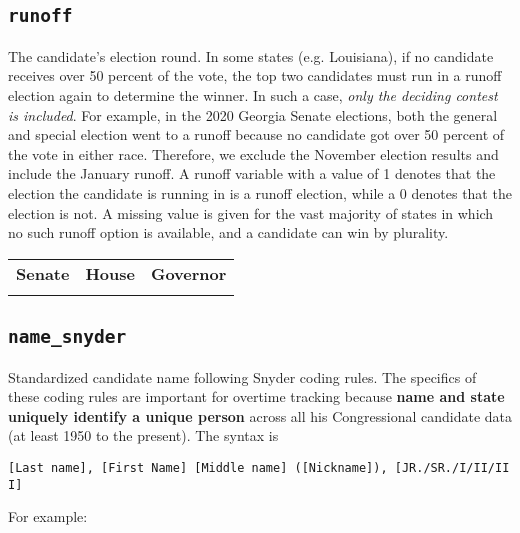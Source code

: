 \documentclass[12pt]{article}
\begin{document}
\FloatBarrier

\subsection*{\texttt{runoff}}

The candidate's election round. In some states (e.g. Louisiana), if no candidate receives over 50 percent of the vote, the top two candidates must run in a runoff election again to determine the winner.
In such a case, \emph{only the deciding contest is included}. For example, in the 2020 Georgia Senate elections, both the general and special election went to a runoff because no candidate got over 50 percent of the vote in either race. Therefore, we exclude the November election results and include the January runoff.
A runoff variable with a value of 1 denotes that the election the candidate is running in is a runoff election, while a 0 denotes that the election is not. A missing value is given for the vast majority of states in which no such runoff option is available, and a candidate can win by plurality.
\begin{table}[!h]
\begin{tabularx}{\linewidth}{CCC}
    \textbf{Senate} & \textbf{House} & \textbf{Governor}\\
     &  & 
\end{tabularx}
\end{table}


\FloatBarrier

\subsection*{\texttt{name\_snyder}}


Standardized candidate name following Snyder coding rules. The
specifics of these coding rules are important for overtime tracking because
\textbf{name and state uniquely identify a unique person} across all his
Congressional candidate data (at least 1950 to the present). The syntax
is

\texttt{{[}Last\ name{]},\ {[}First\ Name{]}\ {[}Middle\ name{]}\ ({[}Nickname{]}),\ {[}JR./SR./I/II/III{]}}

For example:
\end{document}
